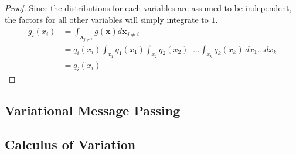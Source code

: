 \begin{proof}
    Since the distributions for each variables are assumed to be independent, the factors for all other variables will simply integrate to $1$. 
    \begin{subequations}
    \begin{align}
        g_i(x_i) &= \int_{\mathbf{x}_{j \neq i}} g(\mathbf{x}) d\mathbf{x}_{j \neq i}\\ 
        &= q_i(x_i) \int_{x_1} q_1(x_1)\int_{x_2}q_2(x_2) \; \;  \dots \int_{x_k} q_k(x_k) \, dx_1 \dots dx_k\\ 
        &= q_i(x_i)
    \end{align}
    \end{subequations}
\end{proof}

\subsection{Variational Message Passing}



\subsection{Calculus of Variation}